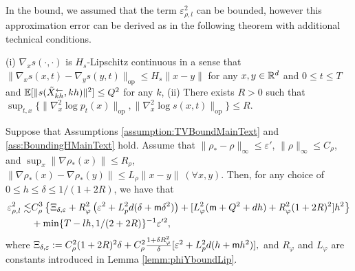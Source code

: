 In the bound, we assumed that the term $\varepsilon_{\rho,l}^2$ can be bounded, however this approximation error can be derived as in the following theorem with additional technical conditions. 
\begin{assumption}[Assumption~\ref{ass:BoundingHMainText} restated]
    (i) $\nabla_x s(\cdot,\cdot)$ is $H_s$-Lipschitz continuous in a sense that $\|\nabla_x s(x,t) - \nabla_y s(y,t)\|_{\mathrm{op}} \leq H_s \|x- y\|$
for any $x,y \in {\mathbb{R}}^d$ and $0 \leq t \leq T$ and $\mathbb{E}[\| s(\tilde{X}_{kh}^\leftarrow,kh)\|^2] \leq Q^2$ for any $k$, 
    (ii) There exists $R > 0$ such that $\sup_{t,x}\{\|\nabla_x^2 \log p_t(x)\|_{\mathrm{op}},\|\nabla_x^2 \log s(x,t)\|_{\mathrm{op}}\} \leq R$.
\end{assumption}
\begin{thm}
Suppose that Assumptions \ref{assumption:TVBoundMainText} and \ref{ass:BoundingHMainText} hold.  
Assume that $\|\rho_* - \rho\|_\infty \leq \varepsilon'$, $\|\rho\|_\infty \leq C_\rho$,
and 
$\sup_x\|\nabla \rho_*(x)\|\leq R_\rho$, $\|\nabla \rho_*(x) - \nabla \rho_*(y)\| \leq L_\rho\|x-y\|~(\forall x,y)$.
Then, for any choice of $0 \leq h \leq \delta \leq 1/(1 + 2R)$, we have that 
\begin{align}
\varepsilon_{\rho,l}^2 %
\lesssim & 
C_\rho^3 \left\{ \Xi_{\delta,\varepsilon}
+  R_\varphi^2 \left(\varepsilon^2+ \Lipdp^2 d(\delta + \mathsf{m} \delta^2) \right) + 
[ L_\varphi^2 (\mathsf{m} + Q^2 + d h)  
+ R_\varphi^2  (1 + 2R)^2] h^2\right\} \\
& +   \min\{T-lh,1/(2+2R)\}^{-1} \varepsilon'^2,
\end{align}
where 
$
\Xi_{\delta,\varepsilon} := C_\rho^2 (1+2R)^2 \delta  
+  C_\rho^2 \frac{1 + \delta R_\varphi^2}{\delta} [\varepsilon^2+ L_p^2 d(h + \mathsf{m} h^2)], 
$ and 
$R_\varphi$ and $L_\varphi$ are constants introduced in Lemma \ref{lemm:phiYboundLip}. 
\end{thm}


